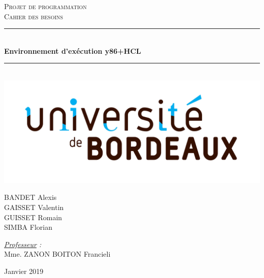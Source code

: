\documentclass[french]{article}
\newcommand{\HRule}{\rule{\linewidth}{0.5mm}}
\begin{document}
\begin{titlepage}
  \begin{sffamily}
  \begin{center}

    \textsc{\LARGE Projet de programmation}\\[2cm]

    \textsc{\Large Cahier des besoins}\\[1.5cm]

    \HRule \\[0.4cm]
    { \huge \bfseries Environnement d'exécution y86+HCL\\[0.4cm] }

    \HRule \\[1cm]
    \includegraphics[scale=0.07]{img/logoUB.jpg}
    \\[2cm]

    \begin{minipage}{0.4\textwidth}
      \begin{flushleft} \large
        \textsc{BANDET} Alexis\\
        \textsc{GAISSET} Valentin\\
        \textsc{GUISSET} Romain\\
        \textsc{SIMBA} Florian\\
      \end{flushleft}
    \end{minipage}
    \begin{minipage}{0.4\textwidth}
      \begin{flushright} \large
        \emph{\underline{Professeur} :}\\ Mme. \textsc{ZANON BOITON} Francieli\\
      \end{flushright}
    \end{minipage}

    \vfill

    {\large Janvier 2019}

  \end{center}
  \end{sffamily}
\end{titlepage}
\end{document}
